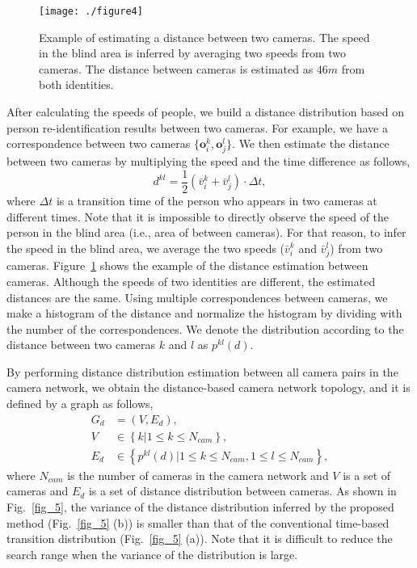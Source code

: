 \documentclass[10pt,twocolumn,letterpaper]{article}
\begin{document}
	
	\begin{figure}[t]	
		\centering
		\texttt{[image: ./figure4]}
		\caption{Example of estimating a distance between two cameras. The speed in the blind area is inferred by averaging two speeds from two cameras. The distance between cameras is estimated as $46m$ from both identities.}
		\label{fig_4}
			\vspace{-5pt}
	\end{figure}
	
	After calculating the speeds of people, we build a distance distribution based on person re-identification results between two cameras.
	For example, we have a correspondence between two cameras $\{\mathbf{o}^{k}_{i}, \mathbf{o}^{l}_{j} \}$. We then estimate the distance between two cameras by multiplying the speed and the time difference as follows,
	\begin{equation}
	\label{eq_6}
	d^{kl} = \frac{1}{2} (\bar{ v }^{ k }_{i} + \bar{ v }^{ l }_{  j }) \cdot \Delta t,
	\end{equation}
	where $\Delta t$ is a transition time of the person who appears in two cameras at different times.
	Note that it is impossible to directly observe the speed of the person in the blind area (i.e., area of between cameras). For that reason, to infer the speed in the blind area, we average the two speeds ($\bar{ v }^{ k }_{i}$ and $\bar{ v }^{ l }_{  j }$) from two cameras.
	Figure~\ref{fig_4} shows the example of the distance estimation between cameras. Although the speeds of two identities are different, the estimated distances are the same.
	Using multiple correspondences between cameras, we make a histogram of the distance and normalize the histogram by dividing with the number of the correspondences. 
	We denote the distribution according to the distance between two cameras $k$ and $l$ as $p^{kl}\left(d\right)$.
	
	By performing distance distribution estimation between all camera pairs in the camera network, we obtain the distance-based camera network topology, and it is defined by a graph as follows,
	\begin{equation}
	\begin{split}
	G_d & =\left(V, E_d\right), \\
	V & \in \left\{k|{ 1\le k \le N_{cam}  } \right\} , \\
	E_d & \in \left\{{p^{kl}\left(d\right)}|{ 1\le k\le N_{cam}, 1\le l\le N_{cam}} \right\}, 
	\end{split}
	\end{equation}
	where $N_{cam}$ is the number of cameras in the camera network and $V$ is a set of cameras and $E_{d}$ is a set of distance distribution between cameras.
	As shown in Fig.~\ref{fig_5}, the variance of the distance distribution inferred by the proposed method (Fig.~\ref{fig_5} (b)) is smaller than that of the conventional time-based transition distribution (Fig.~\ref{fig_5} (a)). Note that it is difficult to reduce the search range when the variance of the distribution is large. 
	
\end{document}
